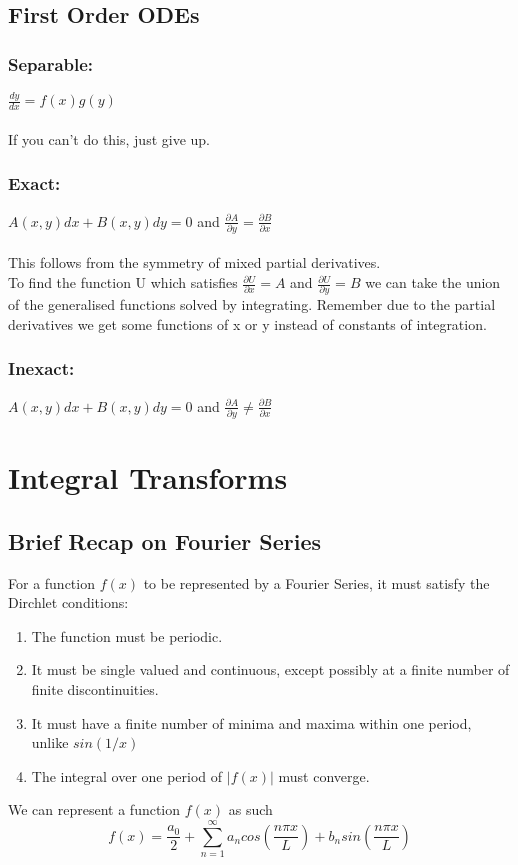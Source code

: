 \documentclass{report}
\begin{document}
\section*{First Order ODEs}
\large{
	\subsection*{\textbf{Separable:}}
	 	$\frac{dy}{dx} = f(x)g(y)$ \\ \\ If you can't do this, just give up.

	\subsection*{\textbf{Exact:}} $A(x,y)dx + B(x,y)dy = 0$ and $\frac{\partial A}{\partial y} = \frac{\partial B}{\partial x}$ \\ \\This follows from the symmetry of mixed partial derivatives.
\\ To find the function U which satisfies $\frac{\partial U}{\partial x} = A$ and $\frac{\partial U}{\partial y} = B$ we can take the union of the generalised functions solved by integrating. Remember due to the partial derivatives we get some functions of x or y instead of constants of integration.

	\subsection*{\textbf{Inexact:}} $A(x,y)dx + B(x,y)dy = 0$ and $\frac{\partial A}{\partial y} \neq \frac{\partial B}{\partial x}$

}
\chapter*{Integral Transforms}
\vspace{10.0mm}
\section*{Brief Recap on Fourier Series}
\large{
	For a function $f(x)$ to be represented by a Fourier Series, it must satisfy the Dirchlet conditions:
	\begin{enumerate}
			\item The function must be periodic.
			\item It must be single valued and continuous, except possibly at a finite number of finite discontinuities.
			\item It must have a finite number of minima and maxima within one period, unlike $sin(1/x)$
			\item The integral over one period of $|f(x)|$ must converge.
	\end{enumerate}

	We can represent a function $f(x)$ as such
	\begin{equation*}
		f(x) = \frac{a_{0}}{2} + \sum_{n = 1}^{\infty}a_{n}cos(\frac{n\pi x}{L}) + b_{n}sin(\frac{n\pi x}{L})
	\end{equation*}

}
\end{document}

